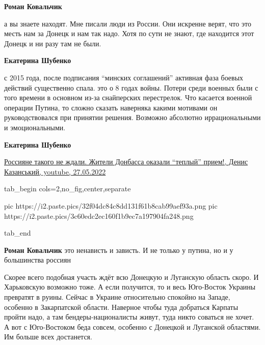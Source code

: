 \begin{itemize} %
\textbf{Роман Ковальчик} 

а вы знаете находят. Мне писали люди из России. Они искренне верят, что это
месть нам за Донецк и нам так надо. Хотя по сути не знают, где находится этот
Донецк и ни разу там не были.

\textbf{Екатерина Шубенко} 

с 2015 года, после подписания \enquote{минских соглашений} активная фаза боевых
действий существенно спала. это о 8 годах войны. Потери среди военных были с
того времени в основном из-за снайперских перестрелок. Что касается военной
операции Путина, то сложно сказать наверняка какими мотивами он
руководствовался при принятии решения. Возможно абсолютно иррациональными и
эмоциональными.

\textbf{Екатерина Шубенко}

\href{https://www.youtube.com/watch?v=o7Gc3NzpILU}{%
Россияне такого не ждали. Жители Донбасса оказали \enquote{теплый} прием!, %
Денис Казанський, youtube, 27.05.2022%
}

\ifcmt
  tab_begin cols=2,no_fig,center,separate

     pic https://i2.paste.pics/32f04dc84c8dd131f61b8cab99aef93a.png
		 pic https://i2.paste.pics/3c60edc2ec160f1b9ec7a197904fa248.png

  tab_end
\fi

\textbf{Роман Ковальчик} это ненависть и зависть. И не только у путина, но и у большинства россиян

\end{itemize} %


Скорее всего подобная участь ждёт всю Донецкую и Луганскую область скоро. И
Харьковскую возможно тоже. А если получится, то и весь Юго-Восток Украины
превратят в руины. Сейчас в Украине относительно спокойно на Западе, особенно в
Закарпатской области. Наверное чтобы туда добраться Карпаты пройти надо, а там
бендеры-националисты живут, туда никто соваться не хочет. А вот с Юго-Востоком
беда совсем, особенно с Донецкой и Луганской областями. Им больше всех
достанется.


